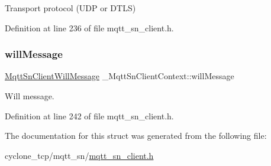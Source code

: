 Transport protocol (U\+DP or D\+T\+LS) 



Definition at line 236 of file mqtt\+\_\+sn\+\_\+client.\+h.

\mbox{\label{struct__MqttSnClientContext_a909d86ca0f5676a1d056c3af9c2d0aed}} 
\subsubsection{\texorpdfstring{will\+Message}{willMessage}}
{\footnotesize\ttfamily \hyperlink{structMqttSnClientWillMessage}{Mqtt\+Sn\+Client\+Will\+Message} \+\_\+\+Mqtt\+Sn\+Client\+Context\+::will\+Message}



Will message. 



Definition at line 242 of file mqtt\+\_\+sn\+\_\+client.\+h.



The documentation for this struct was generated from the following file\+:\begin{DoxyCompactItemize}
\item 
cyclone\+\_\+tcp/mqtt\+\_\+sn/\hyperlink{mqtt__sn__client_8h}{mqtt\+\_\+sn\+\_\+client.\+h}\end{DoxyCompactItemize}
